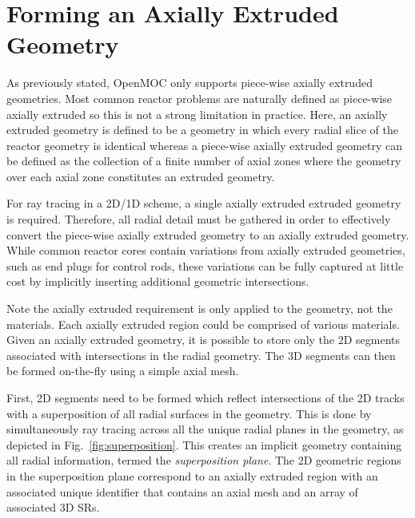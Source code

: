 \section{Forming an Axially Extruded Geometry}
\label{sec:ax-extruded}

As previously stated, OpenMOC only supports piece-wise axially extruded geometries. Most common reactor problems are naturally defined as piece-wise axially extruded so this is not a strong limitation in practice. Here, an axially extruded geometry is defined to be a geometry in which every radial slice of the reactor geometry is identical whereas a piece-wise axially extruded geometry can be defined as the collection of a finite number of axial zones where the geometry over each axial zone constitutes an extruded geometry. 

For ray tracing in a 2D/1D scheme, a single axially extruded extruded geometry is required. Therefore, all radial detail must be gathered in order to effectively convert the piece-wise axially extruded geometry to an axially extruded geometry. While common reactor cores contain variations from axially extruded geometries, such as end plugs for control rods, these variations can be fully captured at little cost by implicitly inserting additional geometric intersections. 

Note the axially extruded requirement is only applied to the geometry, not the materials. Each axially extruded region could be comprised of various materials. Given an axially extruded geometry, it is possible to store only the 2D segments associated with intersections in the radial geometry. The 3D segments can then be formed on-the-fly using a simple axial mesh.

First, 2D segments need to be formed which reflect intersections of the 2D tracks with a superposition of all radial surfaces in the geometry. This is done by simultaneously ray tracing across all the unique radial planes in the geometry, as depicted in Fig.~\ref{fig:superposition}. This creates an implicit geometry containing all radial information, termed the \textit{superposition plane}. The 2D geometric regions in the superposition plane correspond to an axially extruded region with an associated unique identifier that contains an axial mesh and an array of associated 3D \ac{SR}s. 

